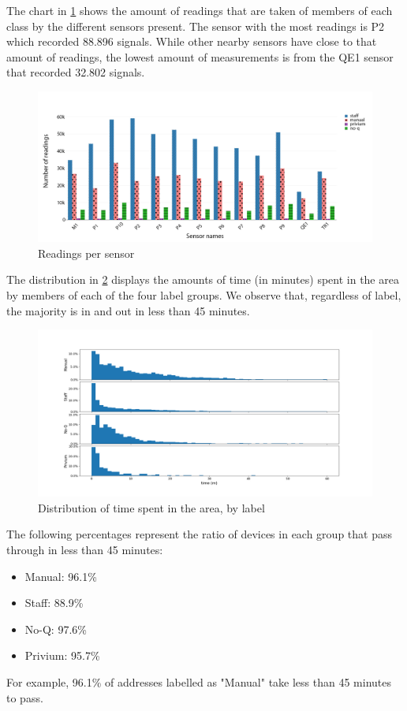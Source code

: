 The chart in \cref{fig:stat:readingspersensor} shows the amount of readings that are taken of members of each class by the different sensors present. The sensor with the most readings is P2 which recorded 88.896 signals. While other nearby sensors have close to that amount of readings, the lowest amount of measurements is from the QE1 sensor that recorded 32.802 signals.\\

\begin{figure}[H]
    \centering
    \includegraphics[width=.8\textwidth]{Pictures/Readings_per_sensor.png}
    \caption{Readings per sensor}
    \label{fig:stat:readingspersensor}
\end{figure}

\pagebreak

The distribution in \cref{fig:stat:timespentdistbylabel} displays the amounts of time (in minutes) spent in the area by members of each of the four label groups. We observe that, regardless of label, the majority is in and out in less than 45 minutes.

\begin{figure}[H]
    \centering
    \includegraphics[width=1\textwidth]{Pictures/timespentdistbylabel.png}
    \caption{Distribution of time spent in the area, by label}
    \label{fig:stat:timespentdistbylabel}
\end{figure}

The following percentages represent the ratio of devices in each group that pass through in less than 45 minutes:

\begin{itemize}
	\item Manual:   96.1\%
	\item Staff:    88.9\%
	\item No-Q:     97.6\%
	\item Privium:  95.7\%
\end{itemize}

For example, 96.1\% of addresses labelled as "Manual" take less than 45 minutes to pass.
